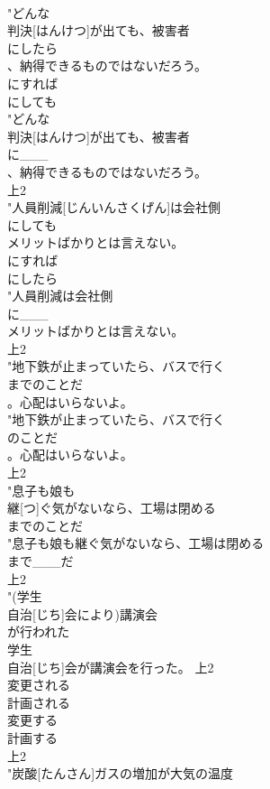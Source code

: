 \documentclass[8pt]{extreport}
\begin{document}
\begin{CJK}{UTF8}{min}
\\	"どんな
\\	判決[はんけつ]が出ても、被害者
\\	にしたら
\\	、納得できるものではないだろう。
\\	にすれば
\\	にしても
\\	"どんな
\\	判決[はんけつ]が出ても、被害者
\\	に___
\\	、納得できるものではないだろう。
\\	上2
\\	"人員削減[じんいんさくげん]は会社側
\\	にしても
\\	メリットばかりとは言えない。
\\	にすれば
\\	にしたら
\\	"人員削減は会社側
\\	に___
\\	メリットばかりとは言えない。
\\	上2
\\	"地下鉄が止まっていたら、バスで行く
\\	までのことだ
\\	。心配はいらないよ。
\\	"地下鉄が止まっていたら、バスで行く
\\	のことだ
\\	。心配はいらないよ。
\\	上2
\\	"息子も娘も
\\	継[つ]ぐ気がないなら、工場は閉める
\\	までのことだ
\\	"息子も娘も継ぐ気がないなら、工場は閉める
\\	まで___だ
\\	上2
\\	"(学生
\\	自治[じち]会により)講演会
\\	が行われた
\\	学生
\\	自治[じち]会が講演会を行った。			上2
\\	変更される
\\	計画される
\\	変更する
\\	計画する
\\	上2
\\	"炭酸[たんさん]ガスの増加が大気の温度

\end{CJK}
\end{document}
